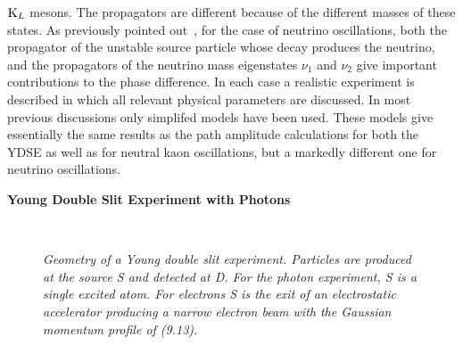 {   ${\rm K}_L$ mesons. The propagators are different because of the different masses of these states.
   As previously pointed out~\cite{JHF1,JHF2,JHF3}, for the case of neutrino oscillations, 
   both the propagator of the unstable source particle whose decay produces the neutrino, and 
   the propagators of the neutrino mass eigenstates $\nu_1$ and $\nu_2$ give important
  contributions to the phase difference. 
   In each case a realistic experiment is described in which all relevant physical parameters
  are discussed. In most previous discussions only simplifed models have been used. These models give 
   essentially the same results as the path amplitude calculations for both the YDSE 
   as well as for neutral
   kaon oscillations, but a markedly different one for neutrino oscillations.

   \par {\bf \Large Young Double Slit Experiment with Photons}
\begin{figure}[htbp]
\begin{center}
\hspace*{-0.5cm}\mbox{
}
\caption{{\sl Geometry of a Young double slit experiment. Particles are 
  produced at the source S and detected at D. For the photon experiment, S is a 
  single excited atom. For electrons S is the exit of an electrostatic 
  accelerator producing a narrow electron beam with the Gaussian momentum
  profile of (9.13). }} 
\label{fig-fig10}
\end{center}
\end{figure}

}

